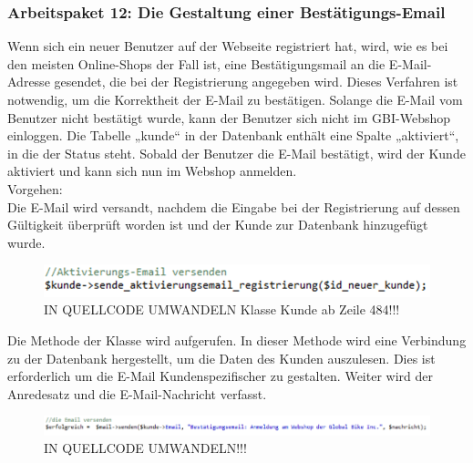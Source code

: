 \newpage

\subsubsection{Arbeitspaket 12: Die Gestaltung einer Bestätigungs-Email}

Wenn sich ein neuer Benutzer auf der Webseite registriert hat, wird, wie es bei den meisten Online-Shops der Fall ist, eine Bestätigungsmail an die E-Mail-Adresse gesendet, die bei der Registrierung angegeben wird. Dieses Verfahren ist notwendig, um die Korrektheit der E-Mail zu bestätigen. 
Solange die E-Mail vom Benutzer nicht bestätigt wurde, kann der Benutzer sich nicht im GBI-Webshop einloggen. Die Tabelle „kunde“ in der Datenbank enthält eine Spalte „aktiviert“, in die der Status steht. Sobald der Benutzer die E-Mail bestätigt, wird der Kunde aktiviert und kann sich nun im Webshop anmelden.
\\
Vorgehen:
\\
Die E-Mail wird versandt, nachdem die Eingabe bei der Registrierung auf dessen Gültigkeit überprüft worden ist und der Kunde zur Datenbank hinzugefügt wurde. 

\begin{figure}[H]
\begin{center}
\includegraphics[width=12cm]{Bilder/Michael_Quellcode1.png}
\end{center}
\caption{IN QUELLCODE UMWANDELN Klasse Kunde ab Zeile 484!!!}
\end{figure}

Die Methode \grqq{} der Klasse \grqq{} wird aufgerufen. In dieser Methode wird eine Verbindung zu der Datenbank hergestellt, um die Daten des Kunden auszulesen.  Dies ist erforderlich um die E-Mail Kundenspezifischer zu gestalten.
Weiter wird der Anredesatz und die E-Mail-Nachricht verfasst.

\begin{figure}[H]
\begin{center}
\includegraphics[width=12cm]{Bilder/Michael_Quellcode2.png}
\end{center}
\caption{IN QUELLCODE UMWANDELN!!!}
\end{figure}

